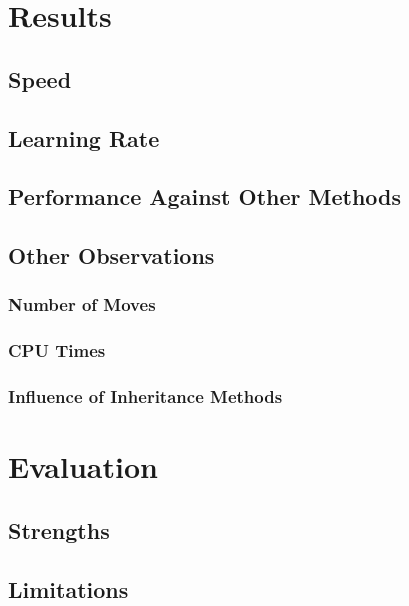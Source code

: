 \documentclass[12pt,a4paper]{article}
\begin{document}
\section{Results}
    
    \subsection{Speed}
    \subsection{Learning Rate}
    \subsection{Performance Against Other Methods}
    \subsection{Other Observations}
        \subsubsection{Number of Moves}
        \subsubsection{CPU Times}
        \subsubsection{Influence of Inheritance Methods}


\section{Evaluation}
    \subsection{Strengths}
    \subsection{Limitations}
\end{document}
